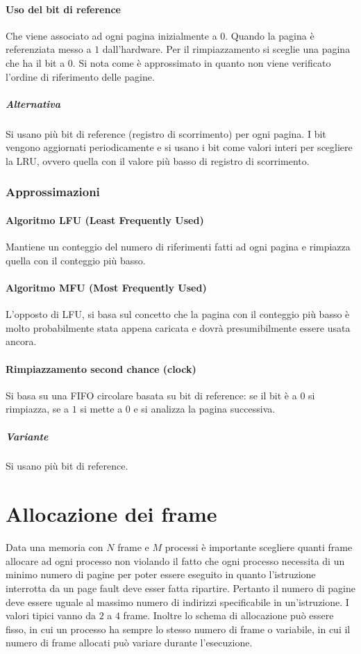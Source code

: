 \paragraph{Uso del bit di reference}
Che viene associato ad ogni pagina inizialmente a $0$. Quando la pagina \`e referenziata messo a $1$ dall'hardware. Per il rimpiazzamento si sceglie una pagina che ha il bit a $0$. Si
nota come \`e approssimato in quanto non viene verificato l'ordine di riferimento delle pagine. 
\subparagraph{Alternativa}
Si usano pi\`u bit di reference (registro di scorrimento) per ogni pagina. I bit vengono aggiornati periodicamente e si usano i bit come valori interi per scegliere la LRU, ovvero 
quella con il valore pi\`u basso di registro di scorrimento. 
\subsubsection{Approssimazioni}
\paragraph{Algoritmo LFU (Least Frequently Used)}
Mantiene un conteggio del numero di riferimenti fatti ad ogni pagina e rimpiazza quella con il conteggio pi\`u basso. 
\paragraph{Algoritmo MFU (Most Frequently Used)}
L'opposto di LFU, si basa sul concetto che la pagina con il conteggio pi\`u basso \`e molto probabilmente stata appena caricata e dovr\`a presumibilmente essere usata ancora. 
\paragraph{Rimpiazzamento second chance (clock)}
Si basa su una FIFO circolare basata su bit di reference: se il bit \`e a $0$ si rimpiazza, se a $1$ si mette a $0$ e si analizza la pagina successiva. 
\subparagraph{Variante}
Si usano pi\`u bit di reference. 
\section{Allocazione dei frame}
Data una memoria con $N$ frame e $M$ processi \`e importante scegliere quanti frame allocare ad ogni processo non violando il fatto che ogni processo necessita di un minimo numero di 
pagine per poter essere eseguito in quanto l'istruzione interrotta da un page fault deve esser fatta ripartire. Pertanto il numero di pagine deve essere uguale al massimo numero di 
indirizzi specificabile in un'istruzione. I valori tipici vanno da $2$ a $4$ frame. Inoltre lo schema di allocazione pu\`o essere fisso, in cui un processo ha sempre lo stesso numero
di frame o variabile, in cui il numero di frame allocati pu\`o variare durante l'esecuzione. 
